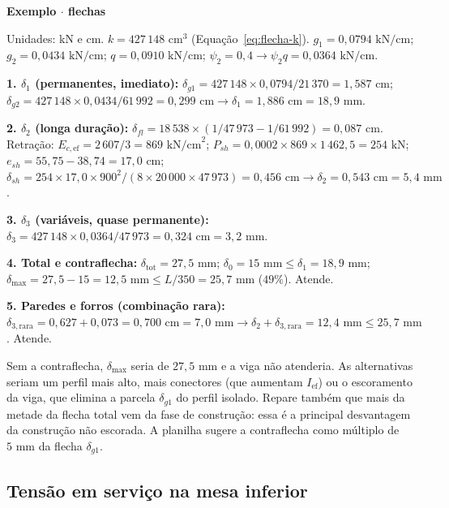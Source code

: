\documentclass[11pt,a4paper]{article}
\newcommand{\caixaexemplo}[2]{%
  \par\vspace{6pt}\noindent\colorbox{examplebg}{%
    \parbox{\dimexpr\linewidth-2\fboxsep\relax}{%
      \vspace{4pt}\textbf{\color{exampleaccent}#1}\par\vspace{3pt}#2\vspace{4pt}%
    }%
  }\par\vspace{6pt}%
}
\begin{document}
\caixaexemplo{Exemplo $\cdot$ flechas}{%
Unidades: kN e cm. $k = 427\,148\text{ cm}^3$ (Equação~\ref{eq:flecha-k}). $g_1 = 0{,}0794\text{ kN/cm}$; $g_2 = 0{,}0434\text{ kN/cm}$; $q = 0{,}0910\text{ kN/cm}$; $\psi_2 = 0{,}4 \rightarrow \psi_2 q = 0{,}0364\text{ kN/cm}$.\par\vspace{3pt}
\textbf{1. $\delta_1$ (permanentes, imediato):} $\delta_{g1} = 427\,148 \times 0{,}0794/21\,370 = 1{,}587\text{ cm}$; $\delta_{g2} = 427\,148 \times 0{,}0434/61\,992 = 0{,}299\text{ cm} \rightarrow \delta_1 = 1{,}886\text{ cm} = 18{,}9\text{ mm}$.\par
\textbf{2. $\delta_2$ (longa duração):} $\delta_{fl} = 18\,538 \times (1/47\,973 - 1/61\,992) = 0{,}087\text{ cm}$. Retração: $E_{c,\text{ef}} = 2\,607/3 = 869\text{ kN/cm}^2$; $P_{sh} = 0{,}0002 \times 869 \times 1\,462{,}5 = 254\text{ kN}$; $e_{sh} = 55{,}75 - 38{,}74 = 17{,}0\text{ cm}$; $\delta_{sh} = 254 \times 17{,}0 \times 900^2/(8 \times 20\,000 \times 47\,973) = 0{,}456\text{ cm} \rightarrow \delta_2 = 0{,}543\text{ cm} = 5{,}4\text{ mm}$.\par
\textbf{3. $\delta_3$ (variáveis, quase permanente):} $\delta_3 = 427\,148 \times 0{,}0364/47\,973 = 0{,}324\text{ cm} = 3{,}2\text{ mm}$.\par
\textbf{4. Total e contraflecha:} $\delta_{\text{tot}} = 27{,}5\text{ mm}$; $\delta_0 = 15\text{ mm} \le \delta_1 = 18{,}9\text{ mm}$; $\delta_{\max} = 27{,}5 - 15 = 12{,}5\text{ mm} \le L/350 = 25{,}7\text{ mm}$ ($49\%$). Atende.\par
\textbf{5. Paredes e forros (combinação rara):} $\delta_{3,\text{rara}} = 0{,}627 + 0{,}073 = 0{,}700\text{ cm} = 7{,}0\text{ mm} \rightarrow \delta_2 + \delta_{3,\text{rara}} = 12{,}4\text{ mm} \le 25{,}7\text{ mm}$. Atende.}

Sem a contraflecha, $\delta_{\max}$ seria de $27{,}5\text{ mm}$ e a viga não atenderia. As alternativas seriam um perfil mais alto, mais conectores (que aumentam $I_{\text{ef}}$) ou o escoramento da viga, que elimina a parcela $\delta_{g1}$ do perfil isolado. Repare também que mais da metade da flecha total vem da fase de construção: essa é a principal desvantagem da construção não escorada. A planilha sugere a contraflecha como múltiplo de $5\text{ mm}$ da flecha $\delta_{g1}$.

\subsection{Tensão em serviço na mesa inferior}
\end{document}
